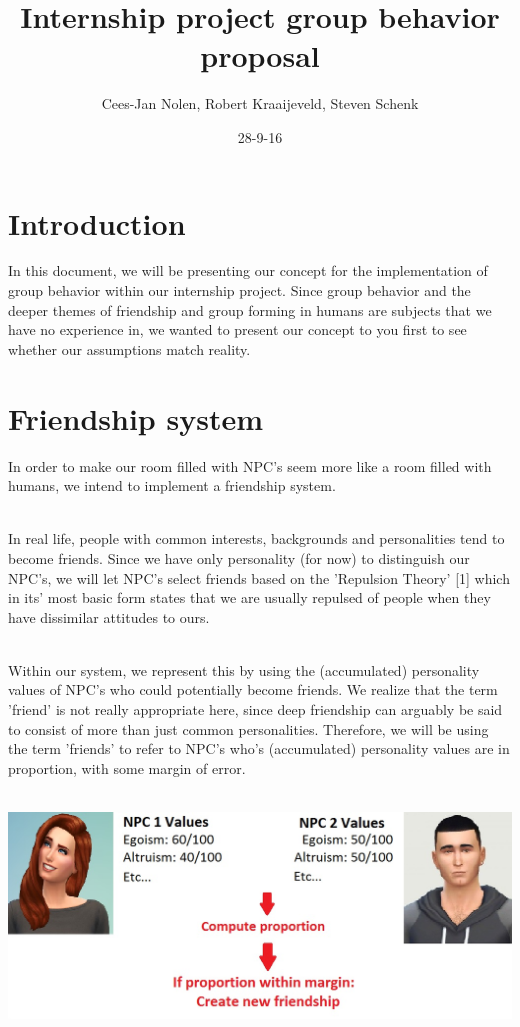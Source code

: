 \documentclass[11pt]{article} %
\title{Internship project group behavior proposal}
\author{Cees-Jan Nolen, Robert Kraaijeveld, Steven Schenk}
\date{28-9-16}
\begin{document}
  \maketitle
  \newpage
  \tableofcontents

\newpage
\section{Introduction}
In this document, we will be presenting our concept for the implementation of group behavior within our internship project. Since group behavior and the deeper themes of friendship and group forming in humans are subjects that we have no experience in, we wanted to present our concept to you first to see whether our assumptions match reality. 


\newpage
\section{Friendship system}
In order to make our room filled with NPC's seem more like a room filled with humans, we intend to implement a friendship system. 

~\\
In real life, people with common interests, backgrounds and personalities tend to become friends. Since we have only personality (for now) to distinguish our NPC's, we will let NPC's select friends based on the 'Repulsion Theory' [1] which in its' most basic form states that we are usually repulsed of people when they have dissimilar attitudes to ours.

~\\
Within our system, we represent this by using the (accumulated) personality values of NPC's who could potentially become friends. We realize that the term 'friend' is not really appropriate here, since deep friendship can arguably be said to consist of more than just common personalities. Therefore, we will be using the term 'friends' to refer to NPC's who's (accumulated) personality values are in proportion, with some margin of error.

~\\
\includegraphics[scale=0.5]{friendshipCreation}
\end{document}
